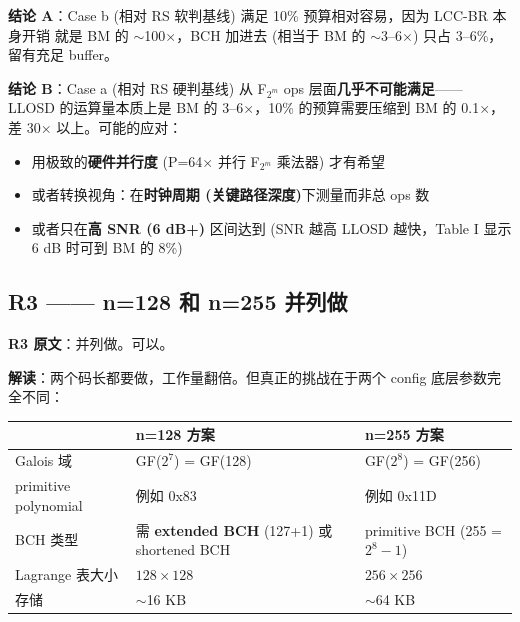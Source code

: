 \documentclass[11pt,a4paper]{article}
\begin{document}
\begin{riskbox}[title=\textbf{Case a 的可行性分析}]
\textbf{结论 A}：Case b (相对 RS 软判基线) 满足 10\% 预算相对容易，因为 LCC-BR 本身开销
就是 BM 的 $\sim$100$\times$，BCH 加进去 (相当于 BM 的 $\sim$3--6$\times$) 只占 3--6\%，
留有充足 buffer。

\textbf{结论 B}：Case a (相对 RS 硬判基线) 从 F$_{2^m}$ ops 层面\textbf{几乎不可能满足}——
LLOSD 的运算量本质上是 BM 的 3--6$\times$，10\% 的预算需要压缩到 BM 的 0.1$\times$，
差 30$\times$ 以上。可能的应对：

\begin{itemize}[leftmargin=1em, itemsep=1pt, topsep=2pt]
\item 用极致的\textbf{硬件并行度} (P=64$\times$ 并行 F$_{2^m}$ 乘法器) 才有希望
\item 或者转换视角：在\textbf{时钟周期 (关键路径深度)}下测量而非总 ops 数
\item 或者只在\textbf{高 SNR (6 dB+)} 区间达到 (SNR 越高 LLOSD 越快，Table I 显示 6 dB 时可到 BM 的 8\%)
\end{itemize}
\end{riskbox}

\subsection{R3 —— n=128 和 n=255 并列做}

\begin{quotebox}
\textbf{R3 原文}：并列做。可以。
\end{quotebox}

\textbf{解读}：两个码长都要做，工作量翻倍。但真正的挑战在于两个 config 底层参数完全不同：

\begin{table}[!ht]
\centering
\begin{tabularx}{\textwidth}{lXX}
\toprule
& \textbf{n=128 方案} & \textbf{n=255 方案} \\
\midrule
Galois 域 & GF($2^7$) = GF(128) & GF($2^8$) = GF(256) \\
primitive polynomial & 例如 0x83 & 例如 0x11D \\
BCH 类型 & 需 \textbf{extended BCH} (127+1) 或 shortened BCH & primitive BCH (255 = $2^8 - 1$) \\
Lagrange 表大小 & $128 \times 128$ & $256 \times 256$ \\
存储 & $\sim$16 KB & $\sim$64 KB \\
\bottomrule
\end{tabularx}
\end{table}
\end{document}
